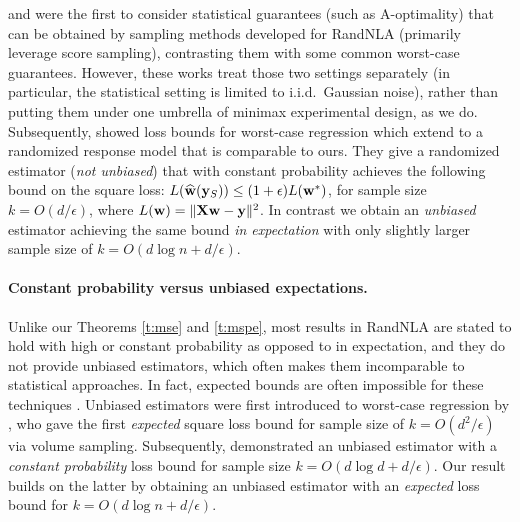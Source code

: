 \documentclass[12pt]{sty/colt2019/colt2018-arxiv}
\begin{document}
 \cite{ping-ma2014} and \cite{garvesh2015} were the first to 
 consider statistical guarantees (such as A-optimality) that can be
 obtained by sampling methods developed for RandNLA (primarily leverage
 score sampling), contrasting them with some common worst-case guarantees.  
However, these works treat those two settings separately (in particular, the statistical setting is limited to i.i.d.~Gaussian noise), rather than putting them under one umbrella of minimax experimental design, as we do.
Subsequently, \cite{chen2017condition} showed loss bounds for
worst-case regression which extend to a randomized response model
that is comparable to ours. 
They give a randomized estimator 
({\em not unbiased}) that with constant probability
achieves the following bound on the square loss:
$L(\widehat{\mathbf w}(\mathbf y_S))\leq(1+\epsilon)L(\mathbf w^*)$, for sample size
$k=O(d/\epsilon)$, where $L(\mathbf w)=\|\mathbf X\mathbf w-\mathbf y\|^2$. %
In contrast we obtain an {\em unbiased} estimator achieving
the same bound \emph{in expectation} with only slightly larger
sample size of $k=O(d\log n+d/\epsilon)$.


\paragraph{Constant probability versus unbiased expectations.}
Unlike our Theorems \ref{t:mse} and \ref{t:mspe}, most results in
RandNLA are stated to hold with high or constant probability
\citep{woodruff2014sketching, DM16_CACM, RandNLA_PCMIchapter_TR} as opposed to in 
expectation, and they do not provide unbiased estimators, which often
makes them incomparable to statistical approaches.
In fact, expected bounds are often impossible for these
techniques \citep[e.g., for leverage score sampling; see][]{unbiased-estimates-journal}.
Unbiased estimators were first introduced to worst-case regression by
\cite{unbiased-estimates}, who gave the first \textit{expected}
square loss bound for sample size of $k=O(d^2/\epsilon)$ via volume
sampling.  
Subsequently, \cite{leveraged-volume-sampling} demonstrated an
unbiased estimator with a \textit{constant probability} loss bound for
sample size $k=O(d\log d+d/\epsilon)$. Our result builds on the latter
by obtaining an unbiased estimator with an \textit{expected} loss
bound for $k=O(d\log n+d/\epsilon)$.
\end{document}
